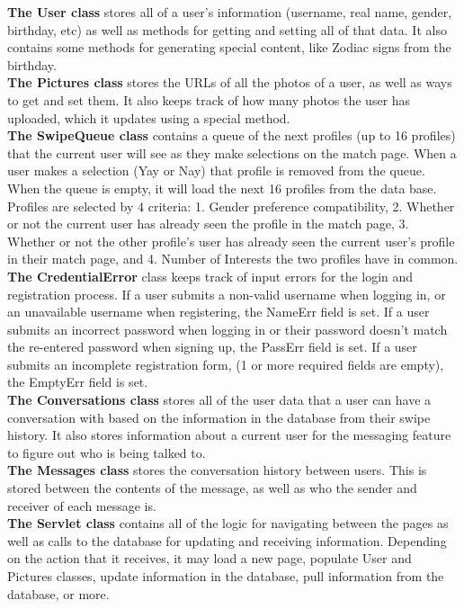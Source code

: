 \documentclass{article}
\begin{document}
    \begin{enumerate}
         \textbf{The User class} stores all of a user's information (username, real name, gender, birthday, etc) as well as methods for getting and setting all of that data. It also contains some methods for generating special content, like Zodiac signs from the birthday.\\
         \textbf{The Pictures class} stores the URLs of all the photos of a user, as well as ways to get and set them. It also keeps track of how many photos the user has uploaded, which it updates using a special method.\\
        \textbf{The SwipeQueue class} contains a queue of the next profiles (up to 16 profiles) that the current user will see as they make selections on the match page. When a user makes a selection (Yay or Nay) that profile is removed from the queue. When the queue is empty, it will load the next 16 profiles from the data base. Profiles are selected by 4 criteria: 1. Gender preference compatibility, 2. Whether or not the current user has already seen the profile in the match page, 3. Whether or not the other profile's user has already seen the current user's profile in their match page, and 4. Number of Interests the two profiles have in common.\\
        \textbf{The CredentialError} class keeps track of input errors for the login and registration process. If a user submits a non-valid username when logging in, or an unavailable username when registering, the NameErr field is set. If a user submits an incorrect password when logging in or their password doesn't match the re-entered password when signing up, the PassErr field is set. If a user submits an incomplete registration form, (1 or more required fields are empty), the EmptyErr field is set.\\
        \textbf{The Conversations class} stores all of the user data that a user can have a conversation with based on the information in the database from their swipe history. It also stores information about a current user for the messaging feature to figure out who is being talked to.\\
        \textbf{The Messages class} stores the conversation history between users. This is stored between the contents of the message, as well as who the sender and receiver of each message is.\\
        \textbf{The Servlet class} contains all of the logic for navigating between the pages as well as calls to the database for updating and receiving information. Depending on the action that it receives, it may load a new page, populate User and Pictures classes, update information in the database, pull information from the database, or more.\\

\end{enumerate}
\end{document}
